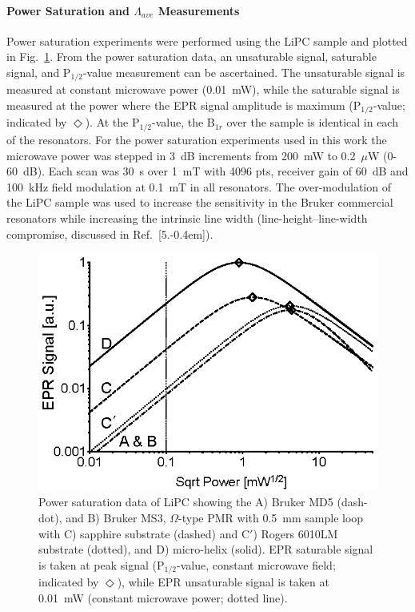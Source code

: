 \paragraph{Power Saturation and $\Lambda_{ave}$ Measurements}
Power saturation experiments were performed using the LiPC sample and plotted in Fig.~\ref{fig:lipcpwrsat}. From the power saturation data, an unsaturable signal, saturable signal, and P$_{1/2}$-value measurement can be ascertained. The unsaturable signal is measured at constant microwave power (0.01~mW), while the saturable signal is measured at the power where the EPR signal amplitude is maximum (P$_{1/2}$-value; indicated by $\Diamond$). At the P$_{1/2}$-value, the B$_{1r}$ over the sample is identical in each of the resonators. For the power saturation experiments used in this work the microwave power was stepped in 3~dB increments from 200~mW to 0.2~$\mu$W (0-60~dB). Each scan was 30~s over 1~mT with 4096 pts, receiver gain of 60~dB and 100~kHz field modulation at 0.1~mT in all resonators. The over-modulation of the LiPC sample was used to increase the sensitivity in the Bruker commercial resonators while increasing the intrinsic line width (line-height--line-width compromise, discussed in Ref.~[5.\kern-0.4em]). 

\begin{figure}[htbp]
\centering
\includegraphics{Kapitel/Appendix/Images/S4-LiPCPowerSat.eps}
\caption[Power saturation data of LiPC comparing resonators.]{Power saturation data of LiPC showing the A) Bruker MD5 (dash-dot), and B) Bruker MS3, $\Omega$-type PMR with 0.5~mm sample loop with C) sapphire substrate (dashed) and C$'$) Rogers 6010LM substrate (dotted), and D) micro-helix (solid). EPR saturable signal is taken at peak signal (P$_{1/2}$-value, constant microwave field; indicated by $\Diamond$), while EPR unsaturable signal is taken at 0.01~mW (constant microwave power; dotted line).}
\label{fig:lipcpwrsat}
\end{figure}

